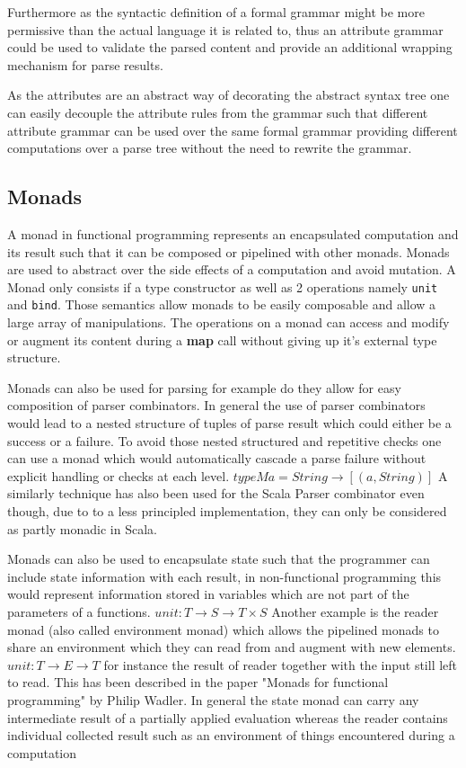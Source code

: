 Furthermore as the syntactic definition of a formal grammar might be more permissive than the actual language it is related to, thus an attribute grammar could be used to validate the parsed content and provide an additional wrapping mechanism for parse results. 

As the attributes are an abstract way of decorating the abstract syntax tree one can easily decouple the attribute rules from the grammar such that different attribute grammar can be used over the same formal grammar providing different computations over a parse tree without the need to rewrite the grammar.

\subsection{Monads}
A monad in functional programming represents an encapsulated computation and its result such that it can be composed or pipelined with other monads. Monads are used to abstract over the side effects of a computation and avoid mutation. A Monad only consists if a type constructor as well as 2 operations namely \verb/unit/ and \verb/bind/. Those semantics allow monads to be easily composable and allow a large array of manipulations. The operations on a monad can access and modify or augment its content during a \textbf{map} call without giving up it's external type structure.
 
Monads can also be used for parsing for example do they allow for easy composition of parser combinators. In general the use of parser combinators would lead to a nested structure of tuples of parse result which could either be a success or a failure. To avoid those nested structured and repetitive checks one can use a monad which would automatically cascade a parse failure without explicit handling or checks at each level.
$type M a = String \rightarrow [(a, String)]$
A similarly technique has also been used for the Scala Parser combinator even though, due to to a less principled implementation, they can only be considered as partly monadic in Scala.

Monads can also be used to encapsulate state such that the programmer can include state information with each result, in non-functional programming this would represent information stored in variables which are not part of the parameters of a functions.
$unit: T \rightarrow S \rightarrow T \times S $
Another example is the reader monad (also called environment monad) which allows the pipelined monads to share an environment which they can read from and augment with new elements.
$unit: T \rightarrow E \rightarrow T $
for instance the result of reader together with the input still left to read. This has been described in the paper "Monads for functional programming" by Philip Wadler. In general the state monad can carry any intermediate result of a partially applied evaluation whereas the reader contains individual collected result such as an environment of things encountered during a computation

